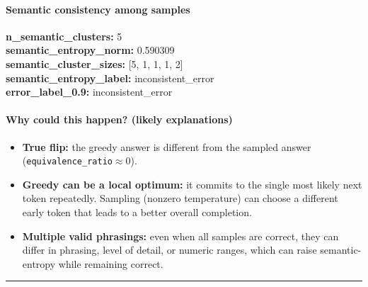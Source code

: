 \documentclass[11pt]{article}
\newcommand{\mono}[1]{\texttt{#1}}
\begin{document}
\paragraph{Semantic consistency among samples}
\textbf{n\_semantic\_clusters:} 5\\
\textbf{semantic\_entropy\_norm:} 0.590309\\
\textbf{semantic\_cluster\_sizes:} [5, 1, 1, 1, 2]\\
\textbf{semantic\_entropy\_label:} inconsistent\_error\\
\textbf{error\_label\_0.9:} inconsistent\_error\\
\paragraph{Why could this happen? (likely explanations)}
\begin{itemize}
\item \textbf{True flip:} the greedy answer is different from the sampled answer (\mono{equivalence\_ratio}$\approx 0$).
\item \textbf{Greedy can be a local optimum:} it commits to the single most likely next token repeatedly. Sampling (nonzero temperature) can choose a different early token that leads to a better overall completion.
\item \textbf{Multiple valid phrasings:} even when all samples are correct, they can differ in phrasing, level of detail, or numeric ranges, which can raise semantic-entropy while remaining correct.
\end{itemize}
\vspace{10pt}
\hrule
\vspace{10pt}
\end{document}
